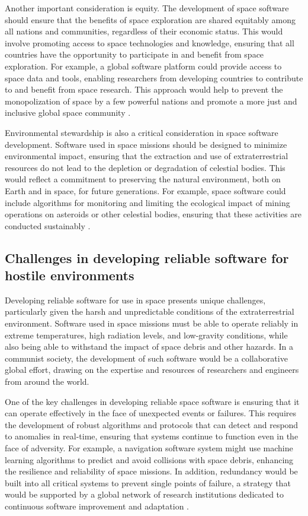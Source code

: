 Another important consideration is equity. The development of space software should ensure that the benefits of space exploration are shared equitably among all nations and communities, regardless of their economic status. This would involve promoting access to space technologies and knowledge, ensuring that all countries have the opportunity to participate in and benefit from space exploration. For example, a global software platform could provide access to space data and tools, enabling researchers from developing countries to contribute to and benefit from space research. This approach would help to prevent the monopolization of space by a few powerful nations and promote a more just and inclusive global space community \cite[pp.~230-233]{bookchin1991}.

Environmental stewardship is also a critical consideration in space software development. Software used in space missions should be designed to minimize environmental impact, ensuring that the extraction and use of extraterrestrial resources do not lead to the depletion or degradation of celestial bodies. This would reflect a commitment to preserving the natural environment, both on Earth and in space, for future generations. For example, space software could include algorithms for monitoring and limiting the ecological impact of mining operations on asteroids or other celestial bodies, ensuring that these activities are conducted sustainably \cite[pp.~90-92]{smith2018}.

\subsection{Challenges in developing reliable software for hostile environments}

Developing reliable software for use in space presents unique challenges, particularly given the harsh and unpredictable conditions of the extraterrestrial environment. Software used in space missions must be able to operate reliably in extreme temperatures, high radiation levels, and low-gravity conditions, while also being able to withstand the impact of space debris and other hazards. In a communist society, the development of such software would be a collaborative global effort, drawing on the expertise and resources of researchers and engineers from around the world.

One of the key challenges in developing reliable space software is ensuring that it can operate effectively in the face of unexpected events or failures. This requires the development of robust algorithms and protocols that can detect and respond to anomalies in real-time, ensuring that systems continue to function even in the face of adversity. For example, a navigation software system might use machine learning algorithms to predict and avoid collisions with space debris, enhancing the resilience and reliability of space missions. In addition, redundancy would be built into all critical systems to prevent single points of failure, a strategy that would be supported by a global network of research institutions dedicated to continuous software improvement and adaptation \cite[pp.~210-213]{nasa2020}.

